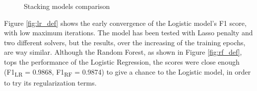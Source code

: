 \begin{figure}[htp!]
	\centering 
	\caption{Stacking models comparison}
\end{figure}

Figure \ref{fig:lr_def} shows the early convergence of the Logistic model's F1 score, with low maximum iterations. The model has been tested with Lasso penalty and two different solvers, but the results, over the increasing of the training epochs, are way similar.
Although the Random Forest, as shown in Figure \ref{fig:rf_def}, tops the performance of the Logistic Regression, the scores were close enough (F1\textsubscript{LR} = 0.9868,  F1\textsubscript{RF} = 0.9874) to give a chance to the Logistic model, in order to try its regularization terms.

